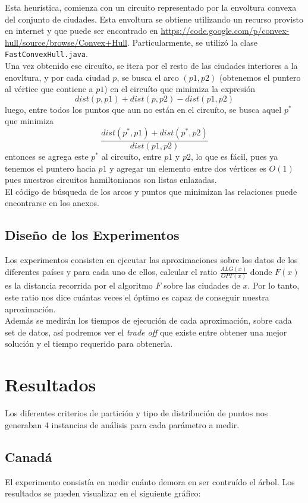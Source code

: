 \documentclass[12pt,letterpaper, margin = 3cm]{article}
\begin{document}
Esta heurística, comienza con un circuito representado por la envoltura convexa del conjunto de ciudades. Esta envoltura se obtiene utilizando un recurso provisto en internet y que puede ser encontrado en \url{https://code.google.com/p/convex-hull/source/browse/Convex+Hull}. Particularmente, se utilizó la clase \verb+FastConvexHull.java+.\\
Una vez obtenido ese circuíto, se itera por el resto de las ciudades interiores a la enovltura, y por cada ciudad $p$, se busca el arco $(p1,p2)$ (obtenemos el puntero al vértice que contiene a $p1$) en el circuíto que minimiza la expresión \[ dist(p,p1)+dist(p,p2)-dist(p1,p2) \] luego, entre todos los puntos que aun no están en el circuíto, se busca aquel $p^*$ que minimiza \[ \frac{dist(p^*,p1)+dist(p^*,p2)}{dist(p1,p2)} \] entonces se agrega este $p^*$ al circuíto, entre $p1$ y $p2$, lo que es fácil, pues ya tenemos el puntero hacia $p1$ y agregar un elemento entre dos vértices es $O(1)$ pues nuestros circuitos hamiltonianos son listas enlazadas.\\
El código de búsqueda de los arcos y puntos que minimizan las relaciones puede encontrarse en los anexos.


\subsection{Diseño de los Experimentos}
Los experimentos consisten en ejecutar las aproximaciones sobre los datos de los diferentes países y para cada uno de ellos, calcular el ratio $\frac{ALG(x)}{OPT(x)}$ donde $F(x)$ es la distancia recorrida por el algoritmo $F$ sobre las ciudades de $x$. Por lo tanto, este ratio nos dice cuántas veces el óptimo es capaz de conseguir nuestra aproximación.\\
Además se medirán los tiempos de ejecución de cada aproximación, sobre cada set de datos, así podremos ver el \textit{trade off} que existe entre obtener una mejor solución y el tiempo requerido para obtenerla.

\newpage
\section{Resultados}
Los diferentes criterios de partición y tipo de distribución de puntos nos generaban 4 instancias de análisis para cada parámetro a medir.

\subsection{Canadá}
El experimento consistía en medir cuánto demora en ser contruído el árbol. Los resultados se pueden visualizar en el siguiente gráfico:
\end{document}
